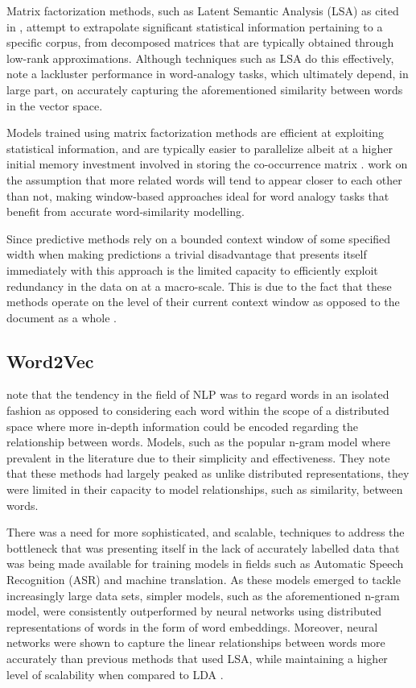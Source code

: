\documentclass[../../fyp.tex]{subfiles}
\begin{document}
Matrix factorization methods, such as Latent Semantic Analysis (LSA) \cite{deerwester1990} as cited in \citet{pennington}, attempt to extrapolate significant statistical information pertaining to a specific corpus, from decomposed matrices that are typically obtained through low-rank approximations. Although techniques such as LSA do this effectively, \citet{pennington} note a lackluster performance in word-analogy tasks, which ultimately depend, in large part, on accurately capturing the aforementioned similarity between words in the vector space.

Models trained using matrix factorization methods are efficient at exploiting statistical information, and are typically easier to parallelize albeit at a higher initial memory investment involved in storing the co-occurrence matrix \cite{pennington}. \citet{mikolov2013} work on the assumption that more related words will tend to appear closer to each other than not, making window-based approaches ideal for word analogy tasks that benefit from accurate word-similarity modelling.

Since predictive methods rely on a bounded context window of some specified width when making predictions a trivial disadvantage that presents itself immediately with this approach is the limited capacity to efficiently exploit redundancy in the data on at a macro-scale. This is due to the fact that these methods operate on the level of their current context window as opposed to the document as a whole \cite{pennington}.

\subsection{Word2Vec}
\citet{mikolov2013} note that the tendency in the field of NLP was to regard words in an isolated fashion as opposed to considering each word within the scope of a distributed space where more in-depth information could be encoded regarding the relationship between words. Models, such as the popular n-gram model where prevalent in the literature due to their simplicity and effectiveness. They note that these methods had largely peaked as unlike distributed representations, they were limited in their capacity to model relationships, such as similarity, between words.

There was a need for more sophisticated, and scalable, techniques to address the bottleneck that was presenting itself in the lack of accurately labelled data that was being made available for training models in fields such as Automatic Speech Recognition (ASR) and machine translation. As these models emerged to tackle increasingly large data sets, simpler models, such as the aforementioned n-gram model, were consistently outperformed by neural networks using distributed representations of words in the form of word embeddings. Moreover, neural networks were shown to capture the linear relationships between words more accurately than previous methods that used LSA, while maintaining a higher level of scalability when compared to LDA \cite{mikolov2013}.
\end{document}
